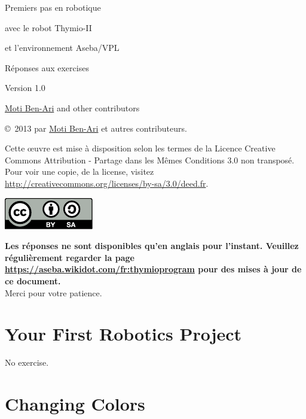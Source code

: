 \documentclass[12pt,a4paper,english]{article}
\begin{document}
\thispagestyle{empty}

\begin{center}
\begin{bfseries}

\begin{Large}
Premiers pas en robotique

avec le robot
Thymio-II

et l'environnement
Aseba/VPL

\bigskip

Réponses aux exercises

\end{Large}

Version 1.0

\bigskip

\href{http://www.weizmann.ac.il/sci-tea/benari/}{Moti Ben-Ari} and other contributors

\end{bfseries}
\end{center}

\bigskip

\copyright{}\  2013 par \href{http://www.weizmann.ac.il/sci-tea/benari/}{Moti Ben-Ari} et autres contributeurs.

Cette œuvre est mise à disposition selon les termes de la Licence Creative Commons Attribution - Partage dans les Mêmes Conditions 3.0 non transposé.
Pour voir une copie, de la license, visitez \url{http://creativecommons.org/licenses/by-sa/3.0/deed.fr}.

\begin{center}
\hspace{6pt}\includegraphics[width=.2\textwidth]{../images/by-sa}
\end{center}

\textbf{Les réponses ne sont disponibles qu'en anglais pour l'instant.
Veuillez régulièrement regarder la page \url{https://aseba.wikidot.com/fr:thymioprogram} pour des mises à jour de ce document.}\\
Merci pour votre patience.

\section{Your First Robotics Project}

No exercise.

\section{Changing Colors}
\end{document}
